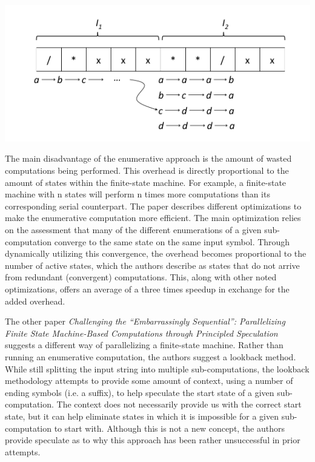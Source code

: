 \documentclass[11pt]{sigplanconf}
\newenvironment{Figure} %
  {\par\medskip\noindent\minipage{\linewidth}}
  {\endminipage\par\medskip}
\begin{document}
\begin{Figure}
\centering
\includegraphics[width=\linewidth]{enumerative_overview.png}
\label{fig:Enumerative Approach}
\end{Figure}

The main disadvantage of the enumerative approach is the amount of wasted computations being performed. This overhead is directly proportional to the amount of states within the finite-state machine. For example, a finite-state machine with n states will perform n times more computations than its corresponding serial counterpart. The paper describes different optimizations to make the enumerative computation more efficient. The main optimization relies on the assessment that many of the different enumerations of a given sub-computation converge to the same state on the same input symbol. Through dynamically utilizing this convergence, the overhead becomes proportional to the number of active states, which the authors describe as states that do not arrive from redundant (convergent) computations. This, along with other noted optimizations, offers an average of a three times speedup in exchange for the added overhead.

The other paper \textit{Challenging the ``Embarrassingly Sequential'': Parallelizing Finite State Machine-Based Computations through Principled Speculation} \cite{william_and_mary} suggests a different way of parallelizing a finite-state machine. Rather than running an enumerative computation, the authors suggest a lookback method. While still splitting the input string into multiple sub-computations, the lookback methodology attempts to provide some amount of context, using a number of ending symbols (i.e. a suffix), to help speculate the start state of a given sub-computation. The context does not necessarily provide us with the correct start state, but it can help eliminate states in which it is impossible for a given sub-computation to start with. Although this is not a new concept, the authors provide speculate as to why this approach has been rather unsuccessful in prior attempts.
\end{document}
